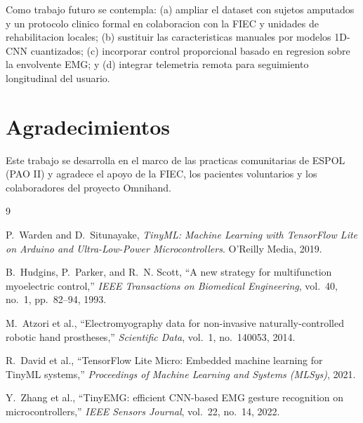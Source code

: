 \documentclass[11pt,a4paper]{article}
\begin{document}
Como trabajo futuro se contempla: (a) ampliar el dataset con sujetos
amputados y un protocolo clinico formal en colaboracion con la FIEC y
unidades de rehabilitacion locales; (b) sustituir las caracteristicas
manuales por modelos 1D-CNN cuantizados; (c) incorporar control
proporcional basado en regresion sobre la envolvente EMG; y (d)
integrar telemetria remota para seguimiento longitudinal del usuario.

\section*{Agradecimientos}
Este trabajo se desarrolla en el marco de las practicas comunitarias
de ESPOL (PAO II) y agradece el apoyo de la FIEC, los pacientes
voluntarios y los colaboradores del proyecto Omnihand.

\begin{thebibliography}{9}

P.~Warden and D.~Situnayake,
\emph{TinyML: Machine Learning with TensorFlow Lite on Arduino and
Ultra-Low-Power Microcontrollers}.
O'Reilly Media, 2019.

B.~Hudgins, P.~Parker, and R.~N. Scott,
``A new strategy for multifunction myoelectric control,''
\emph{IEEE Transactions on Biomedical Engineering},
vol.~40, no.~1, pp.~82--94, 1993.

M.~Atzori et al.,
``Electromyography data for non-invasive naturally-controlled robotic
hand prostheses,''
\emph{Scientific Data}, vol.~1, no.~140053, 2014.

R.~David et al.,
``TensorFlow Lite Micro: Embedded machine learning for TinyML systems,''
\emph{Proceedings of Machine Learning and Systems (MLSys)}, 2021.

Y.~Zhang et al.,
``TinyEMG: efficient CNN-based EMG gesture recognition on
microcontrollers,''
\emph{IEEE Sensors Journal}, vol.~22, no.~14, 2022.

\end{thebibliography}
\end{document}
